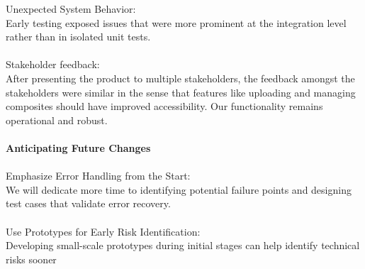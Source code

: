 \documentclass[12pt, titlepage]{article}
\begin{document}
\begin{enumerate}
Unexpected System Behavior: \\Early testing exposed issues that were more prominent at the integration level rather than in isolated unit tests.\\
\\Stakeholder feedback:\\ After presenting the product to multiple stakeholders, the feedback amongst the stakeholders were similar in the sense that features like uploading and managing composites should have improved accessibility. Our functionality remains operational and robust. \\
\\\textbf{Anticipating Future Changes}\\
\\Emphasize Error Handling from the Start: \\We will dedicate more time to identifying potential failure points and designing test cases that validate error recovery.\\
\\Use Prototypes for Early Risk Identification: \\Developing small-scale prototypes during initial stages can help identify technical risks sooner\\
\end{enumerate}
\end{document}
